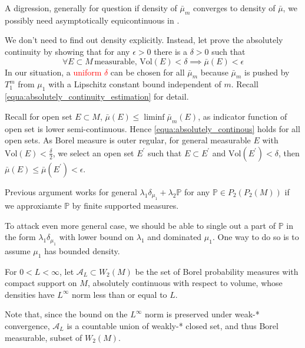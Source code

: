 A digression, generally for question if density of $\bar{\mu}_m$ converges to density of $\bar{\mu}$,
we possibly need asymptotically equicontinuous in \cite{Sweeting1986Converse}.

We don't need to find out density explicitly.
Instead, let prove the absolutely continuity by showing that
for any $\epsilon > 0$ there is a $\delta > 0$ such that
\begin{equation}
	\label{equa:absolutely_continous}
	\forall E \subset M \, \text{measurable, } \text{Vol}(E) < \delta
	\implies \bar{\mu}(E) < \epsilon
\end{equation}
In our situation, a \textcolor{red}{uniform $\delta$} can be chosen for all $\bar{\mu}_m$
because $\bar{\mu}_m$ is pushed by $T_1^{m}$ from $\mu_1$ with a Lipschitz constant bound
independent of $m$.
Recall \cref{equa:absolutely_continuity_estimation} for detail.

Recall for open set $E \subset M$, $\bar{\mu}(E) \leq \liminf \bar{\mu}_m(E)$,
as indicator function of open set is lower semi-continuous.
Hence \cref{equa:absolutely_continous} holds for all open sets.
As Borel measure is outer regular, for general measurable $E$ with $\text{Vol}(E) < \frac{\delta}{2}$,
we select an open set $E^\prime$ such that
$ E \subset E^\prime$ and $ \text{Vol}(E^\prime) < \delta$,
then $\bar{\mu}(E) \leq \bar{\mu}(E^\prime) < \epsilon$.

Previous argument works for general $\lambda_1 \delta_{\mu_1} + \lambda_2 \mathbb{P}$ for any $\mathbb{P} \in P_2(P_2(M))$
if we approxiamte $\mathbb{P}$ by finite supported measures.

To attack even more general case,
we should be able to single out a part of $\mathbb{P}$ in the form $\lambda_1 \delta_{\mu_1}$
with lower bound on $\lambda_1$ and dominated $\mu_1$.
One way to do so is to assume $\mu_1$ has bounded density.
\begin{defn}
	For \( 0 < L < \infty \), let \( \mathcal { A } _ { L } \subset W_2(M) \) be the set of Borel probability
	measures with compact support on \( M \), absolutely continuous with respect to volume, whose densities have \( L ^ { \infty } \)
	norm less than or equal to \( L\).
\end{defn}

Note that, since the bound on the \( L ^ { \infty } \) norm is preserved under weak-* convergence,
\( \mathcal { A } _ { L } \) is a countable union of weakly-* closed set, and thus Borel measurable, subset of \( W_2( M ) \).

